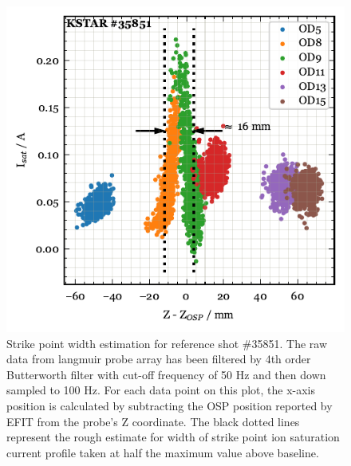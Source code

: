 \begin{figure}[!ht]
 \centering
 \includegraphics[width=\linewidth]{figures/StrikePointWidth.pdf}
 \caption{
Strike point width estimation for reference shot \#35851.
The raw data from langmuir probe array has been filtered by 4th order Butterworth filter with cut-off frequency of 50 Hz and then down sampled to 100 Hz.
For each data point on this plot, the x-axis position is calculated by subtracting the \ac{OSP} position reported by EFIT from the probe's Z coordinate.
The black dotted lines represent the rough estimate for width of strike point ion saturation current profile taken at half the maximum value above baseline.
}
 \label{fig:strike_point_width}
\end{figure}